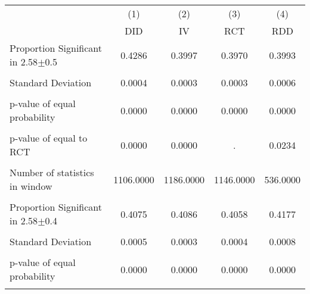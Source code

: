 {
\def\sym#1{\ifmmode^{#1}\else\(^{#1}\)\fi}
\begin{tabular}{l*{4}{c}}
\hline\hline
                &\multicolumn{1}{c}{(1)}&\multicolumn{1}{c}{(2)}&\multicolumn{1}{c}{(3)}&\multicolumn{1}{c}{(4)}\\
                &\multicolumn{1}{c}{DID}&\multicolumn{1}{c}{IV}&\multicolumn{1}{c}{RCT}&\multicolumn{1}{c}{RDD}\\
\hline
\hline Proportion Significant in 2.58$\pm$0.5&   0.4286         &   0.3997         &   0.3970         &   0.3993         \\
                &                  &                  &                  &                  \\
Standard Deviation&   0.0004         &   0.0003         &   0.0003         &   0.0006         \\
                &                  &                  &                  &                  \\
p-value of equal probability&   0.0000         &   0.0000         &   0.0000         &   0.0000         \\
                &                  &                  &                  &                  \\
p-value of equal to RCT&   0.0000         &   0.0000         &        .         &   0.0234         \\
                &                  &                  &                  &                  \\
Number of statistics in window&1106.0000         &1186.0000         &1146.0000         & 536.0000         \\
                &                  &                  &                  &                  \\
\hline Proportion Significant in 2.58$\pm$0.4&   0.4075         &   0.4086         &   0.4058         &   0.4177         \\
                &                  &                  &                  &                  \\
Standard Deviation&   0.0005         &   0.0003         &   0.0004         &   0.0008         \\
                &                  &                  &                  &                  \\
p-value of equal probability&   0.0000         &   0.0000         &   0.0000         &   0.0000         \\
                &                  &                  &                  &                  \\

\end{tabular}}
